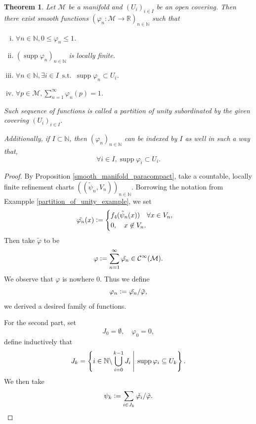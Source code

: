 \documentclass[10pt]{article}
\newtheorem{theorem}{Theorem} [section]
\DeclareMathOperator{\straw}{s.t.}
\DeclareMathOperator{\supp}{supp}
\newcommand{\defeq}{\vcentcolon=}
\newcommand{\N}[0]{\mathbb{N}}
\newcommand{\R}[0]{\mathbb{R}}
\newcommand{\st}[0]{\:\straw\:}
\begin{document}
\begin{theorem}
  Let $\mathcal{M}$ be a manifold and $(U_i)_{i\in I}$ be an open covering. Then there exist smooth functions $(\varphi_n:\mathcal{M}\to\R)_{n\in\N}$ such that 
  \begin{enumerate}[i).]
    \item $\forall n\in\N, 0\leq\varphi_n\leq 1$.
    \item $(\supp\varphi_n)_{n\in\N}$ is locally finite.
    \item $\forall n\in\N,\exists i\in I\st \supp\varphi_n\subset U_i$.
    \item $\forall p\in\mathcal{M}, \sum_{n=1}^\infty \varphi_n(p) = 1$. 
  \end{enumerate}
  Such sequence of functions is called a partition of unity subordinated by the given covering $(U_i)_{i\in I}$.
  \par Additionally, if $I\subset\N$, then $(\varphi_n)_{n\in\N}$ can be indexed by $I$ as well in such a way that,
  \begin{equation*}
    \forall i\in I, \supp\varphi_i \subset U_i.
  \end{equation*}
  \label{partition_of_unity_existence}
\end{theorem}
\begin{proof}
By Proposition \ref{smooth_manifold_paracompact}, take a countable, locally finite refinement charts $((\tilde{\psi}_n,V_n))_{n\in\N}$. Borrowing the notation from Exampple \ref{partition_of_unity_example}, we set 
\begin{equation*}
  \tilde{\varphi_n}(x) \defeq
  \begin{cases}
    f_4(\tilde{\psi}_n(x))\quad \forall x\in V_n,\\
    0,\quad x\not\in V_n.
  \end{cases}
\end{equation*}
Then take $\tilde{\varphi}$ to be 
\begin{equation*}
  \varphi\defeq \sum_{n=1}^\infty \tilde{\varphi_n}\in\mathcal{C}^\infty(\mathcal{M}).
\end{equation*}
We observe that $\varphi$ is nowhere $0$. Thus we define 
\begin{equation*}
  \varphi_n \defeq \tilde{\varphi_n}/\tilde{\varphi},
\end{equation*}
we derived a desired family of functions. 
\par For the second part, set 
\begin{equation*}
  J_0 = \emptyset,\quad \varphi_0 = 0,
\end{equation*}
define inductively that 
\begin{equation*}
  J_k = \left\{i\in\N\backslash\bigcup_{i=0}^{k-1}J_i\:\Bigg{|}\: \supp\varphi_i\subseteq U_k\right\}. 
\end{equation*}
We then take 
\begin{equation*}
  \psi_k \defeq \sum_{i\in J_k} \tilde{\varphi_i}/\tilde{\varphi}.
\end{equation*}
\end{proof}
\end{document}
